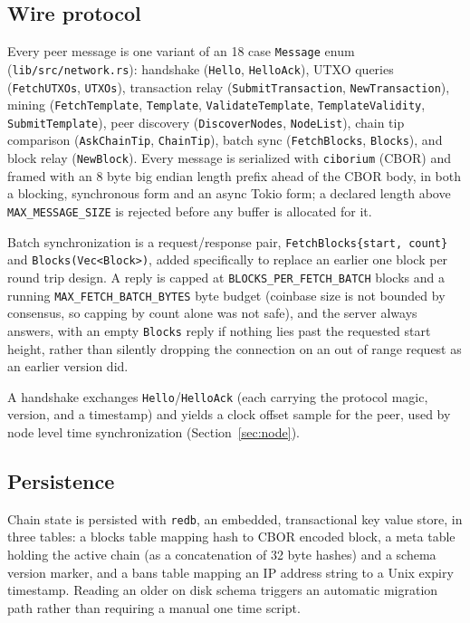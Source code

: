 \documentclass[11pt]{article}
\newcommand{\code}[1]{\texttt{#1}}
\begin{document}
\subsection{Wire protocol}

Every peer message is one variant of an 18 case \code{Message} enum (\code{lib/src/network.rs}): handshake (\code{Hello}, \code{HelloAck}), UTXO queries (\code{FetchUTXOs}, \code{UTXOs}), transaction relay (\code{SubmitTransaction}, \code{NewTransaction}), mining (\code{FetchTemplate}, \code{Template}, \code{ValidateTemplate}, \code{TemplateValidity}, \code{SubmitTemplate}), peer discovery (\code{DiscoverNodes}, \code{NodeList}), chain tip comparison (\code{AskChainTip}, \code{ChainTip}), batch sync (\code{FetchBlocks}, \code{Blocks}), and block relay (\code{NewBlock}). Every message is serialized with \code{ciborium} (CBOR) and framed with an 8 byte big endian length prefix ahead of the CBOR body, in both a blocking, synchronous form and an async Tokio form; a declared length above \code{MAX_MESSAGE_SIZE} is rejected before any buffer is allocated for it.

Batch synchronization is a request/response pair, \code{FetchBlocks\{start, count\}} and \code{Blocks(Vec<Block>)}, added specifically to replace an earlier one block per round trip design. A reply is capped at \code{BLOCKS_PER_FETCH_BATCH} blocks and a running \code{MAX_FETCH_BATCH_BYTES} byte budget (coinbase size is not bounded by consensus, so capping by count alone was not safe), and the server always answers, with an empty \code{Blocks} reply if nothing lies past the requested start height, rather than silently dropping the connection on an out of range request as an earlier version did.

A handshake exchanges \code{Hello}/\code{HelloAck} (each carrying the protocol magic, version, and a timestamp) and yields a clock offset sample for the peer, used by node level time synchronization (Section~\ref{sec:node}).

\subsection{Persistence}

Chain state is persisted with \code{redb}, an embedded, transactional key value store, in three tables: a blocks table mapping hash to CBOR encoded block, a meta table holding the active chain (as a concatenation of 32 byte hashes) and a schema version marker, and a bans table mapping an IP address string to a Unix expiry timestamp. Reading an older on disk schema triggers an automatic migration path rather than requiring a manual one time script.
\end{document}
